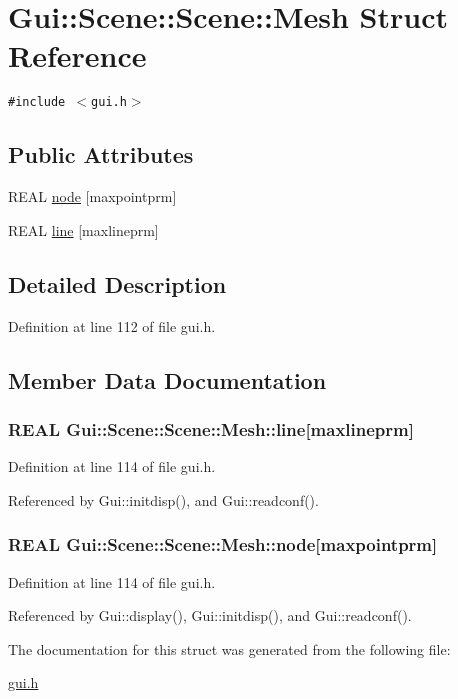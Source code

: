 \hypertarget{structGui_1_1Scene_1_1Mesh}{
\section{Gui::Scene::Scene::Mesh Struct Reference}
\label{structGui_1_1Scene_1_1Mesh}
}
{\tt \#include $<$gui.h$>$}

\subsection*{Public Attributes}
\begin{CompactItemize}
\item 
REAL \hyperlink{structGui_1_1Scene_1_1Mesh_d66ceec860d4068a566c05fa917b02db}{node} \mbox{[}maxpointprm\mbox{]}
\item 
REAL \hyperlink{structGui_1_1Scene_1_1Mesh_740cfcf965e40a332c55a8351f2fad94}{line} \mbox{[}maxlineprm\mbox{]}
\end{CompactItemize}


\subsection{Detailed Description}


Definition at line 112 of file gui.h.

\subsection{Member Data Documentation}
\hypertarget{structGui_1_1Scene_1_1Mesh_740cfcf965e40a332c55a8351f2fad94}{
\subsubsection[{line}]{\setlength{\rightskip}{0pt plus 5cm}REAL Gui::Scene::Scene::Mesh::line\mbox{[}maxlineprm\mbox{]}}}
\label{structGui_1_1Scene_1_1Mesh_740cfcf965e40a332c55a8351f2fad94}




Definition at line 114 of file gui.h.

Referenced by Gui::initdisp(), and Gui::readconf().\hypertarget{structGui_1_1Scene_1_1Mesh_d66ceec860d4068a566c05fa917b02db}{
\subsubsection[{node}]{\setlength{\rightskip}{0pt plus 5cm}REAL Gui::Scene::Scene::Mesh::node\mbox{[}maxpointprm\mbox{]}}}
\label{structGui_1_1Scene_1_1Mesh_d66ceec860d4068a566c05fa917b02db}




Definition at line 114 of file gui.h.

Referenced by Gui::display(), Gui::initdisp(), and Gui::readconf().

The documentation for this struct was generated from the following file:\begin{CompactItemize}
\item 
\hyperlink{gui_8h}{gui.h}\end{CompactItemize}
